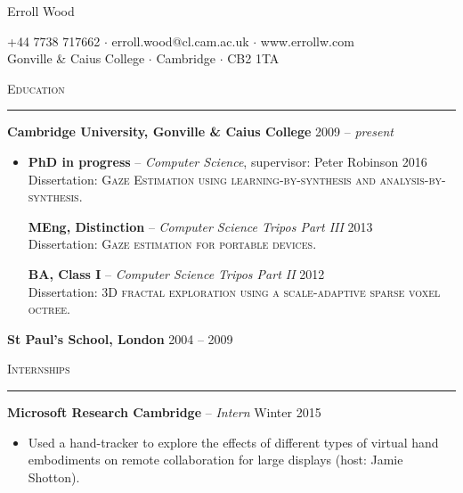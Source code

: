 \documentclass{article}
\begin{document}
\begin{center}
  {\Large Erroll Wood}
  
  \small{
	  +44 7738 717662 $\cdot$ erroll.wood@cl.cam.ac.uk $\cdot$ www.errollw.com \\
	  Gonville \& Caius College $\cdot$ Cambridge $\cdot$ CB2 1TA \\
  }
\end{center} \medskip 

\textsc{Education} \smallskip \hrule \smallskip
\textbf{Cambridge University, Gonville \& Caius College} \hfill 2009 -- \emph{present} \\[-4mm]

\begin{itemize}
  \item[]
  \textbf{PhD in progress} -- \emph{Computer Science}, supervisor: Peter Robinson \hfill 2016 \\
  Dissertation: \textsc{Gaze Estimation using learning-by-synthesis and analysis-by-synthesis}. \
  
  \textbf{MEng, Distinction} -- \emph{Computer Science Tripos Part III} \hfill 2013 \\
  Dissertation: \textsc{Gaze estimation for portable devices}.

  \textbf{BA, Class I} -- \emph{Computer Science Tripos Part II} \hfill 2012 \\
  Dissertation: \textsc{3D fractal exploration using a scale-adaptive sparse voxel octree}.
\end{itemize} \smallskip

\textbf{St Paul's School, London} \hfill 2004 -- 2009 \\[-6mm]
\bigskip

\textsc{Internships} \smallskip \hrule \smallskip

\textbf{Microsoft Research Cambridge} -- \emph{Intern} \hspace*{\fill} Winter
2015 \\[-6mm]
\begin{itemize}
  \item[]
  Used a hand-tracker to explore the effects of different types of virtual hand embodiments on remote collaboration for large displays (host: Jamie Shotton).
\end{itemize} \smallskip
\end{document}
